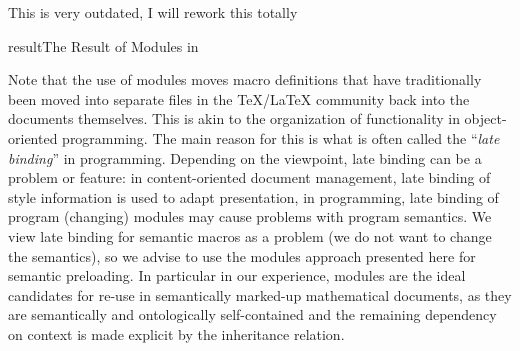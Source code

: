 \begin{oldpart}{This is very outdated, I will rework this totally}
\begin{myfig}{result}{The Result of Modules in {}}
\end{myfig}

Note that the use of {\stex} modules moves macro definitions that have traditionally been
moved into separate files in the {\TeX/\LaTeX} community back into the documents
themselves. This is akin to the organization of functionality in object-oriented
programming. The main reason for this is what is often called the ``{\em{late binding}}''
in programming. Depending on the viewpoint, late binding can be a problem or feature: in
content-oriented document management, late binding of style information is used to adapt
presentation, in programming, late binding of program (changing) modules may cause
problems with program semantics.  We view late binding for semantic macros as a problem
(we do not want to change the semantics), so we advise to use the modules approach
presented here for semantic preloading. In particular in our experience, modules are the
ideal candidates for re-use in semantically marked-up mathematical documents, as they are
semantically and ontologically self-contained and the remaining dependency on context is
made explicit by the inheritance relation.


\end{oldpart}
